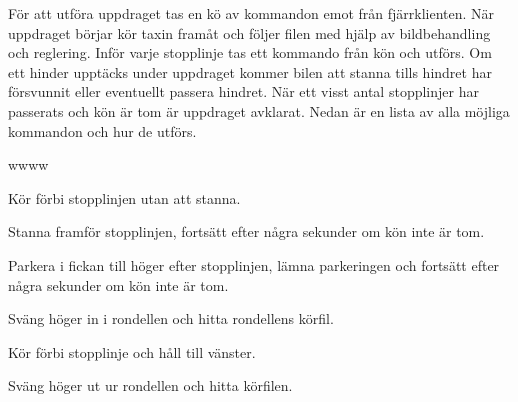 \documentclass[tekniskrapport/tech.tex]{subfiles}
\begin{document}
För att utföra uppdraget tas en kö av kommandon emot från fjärrklienten.
När uppdraget börjar kör taxin framåt och följer filen med hjälp av
bildbehandling och reglering. Inför varje stopplinje tas ett kommando från kön
och utförs. Om ett hinder upptäcks under uppdraget kommer bilen att stanna
tills hindret har försvunnit eller eventuellt passera hindret. När ett visst
antal stopplinjer har passerats och kön är tom är uppdraget avklarat. Nedan är
en lista av alla möjliga kommandon och hur de utförs.
\begin{labeling}{wwww}
    \item[\commIgnore] Kör förbi stopplinjen utan att stanna.
    \item[\commStop] Stanna framför stopplinjen, fortsätt efter några sekunder
    om kön inte är tom.
    \item[\commPark] Parkera i fickan till höger efter stopplinjen, lämna
    parkeringen och fortsätt efter några sekunder om kön inte är tom.
    \item[\commEnter] Sväng höger in i rondellen och hitta rondellens körfil.
    \item[\commContinue] Kör förbi stopplinje och håll till vänster.
    \item[\commExit] Sväng höger ut ur rondellen och hitta körfilen.
\end{labeling}
\end{document}
